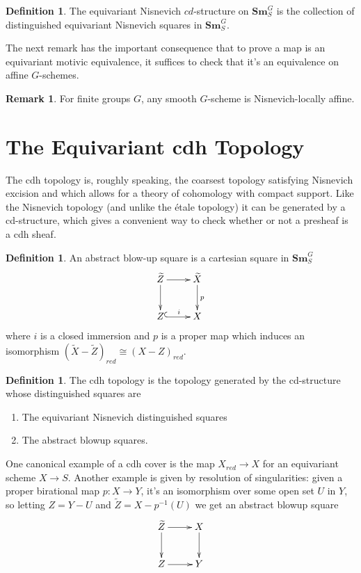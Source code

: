 \documentclass[edeposit,fullpage]{uiucthesis2009}
\newcommand{\Sm}[1]{\mathbf{Sm}_{#1}}
\theoremstyle{plain}
\numberwithin{lemma}{section}
\theoremstyle{definition}
\newtheorem{definition}[lemma]{Definition}
\newtheorem{remark}[lemma]{Remark}
\begin{document}
\begin{definition}
The equivariant Nisnevich $cd$-structure on $\Sm{S}^G$ is the
collection of distinguished equivariant Nisnevich squares in $\Sm{S}^G$.
\end{definition}

The next remark has the important consequence that to prove a map is
an equivariant motivic equivalence, it suffices to check that it's an
equivalence on affine $G$-schemes. 

\begin{remark}
For finite groups $G$, any smooth $G$-scheme is Nisnevich-locally
affine. 
\end{remark}

\section{The Equivariant cdh Topology}

The cdh topology is, roughly speaking, the coarsest topology
satisfying Nisnevich excision and which allows for a theory of
cohomology with compact support. Like the Nisnevich topology (and
unlike the \'etale topology) it can be generated by a cd-structure,
which gives a convenient way to check whether or not a presheaf is a
cdh sheaf. 

\begin{definition}\label{def:cdh_top}
An abstract blow-up square is a cartesian square in $\Sm{S}^G$
\[
\xymatrix{\widetilde Z \ar[r]\ar[d] & \widetilde X \ar[d]^p \\ Z \ar@{^{(}->}[r]^i & X}
\]
where $i$ is a closed immersion and $p$ is a proper map which induces
an isomorphism $(\widetilde X - \widetilde Z)_{red} \cong (X-Z)_{red}$.
\end{definition}

\begin{definition}
The cdh topology is the topology generated by the cd-structure whose
distinguished squares are
\begin{enumerate}
\item The equivariant Nisnevich distinguished squares
\item The abstract blowup squares.
\end{enumerate}
\end{definition}

One canonical example of a cdh cover is the map $X_{red} \rightarrow
X$ for an equivariant scheme $X \rightarrow S$. Another example is given by resolution of singularities: given a
proper birational map $p : X \rightarrow Y$, it's an isomorphism over
some open set $U$ in $Y$, so letting $Z = Y-U$ and $\widetilde Z = X -
p^{-1}(U)$ we get an abstract blowup square
\[
\xymatrix{\widetilde Z \ar[r] \ar[d] & X \ar[d] \\ Z \ar[r] & Y}
\]
\end{document}
